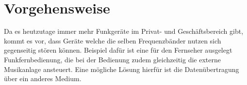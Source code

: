 \section{Vorgehensweise}
\label{sec:method}
Da es heutzutage immer mehr Funkgeräte im Privat- und Geschäftsbereich gibt,
kommt es vor, dass Geräte welche die selben Frequenzbänder nutzen sich gegenseitig
stören können. Beispiel dafür ist eine für den Fernseher ausgelegt Funkfernbedienung,
die bei der Bedienung zudem gleichzeitig die externe Musikanlage
ansteuert. Eine mögliche Lösung hierfür ist die Datenübertragung über ein anderes
Medium.

